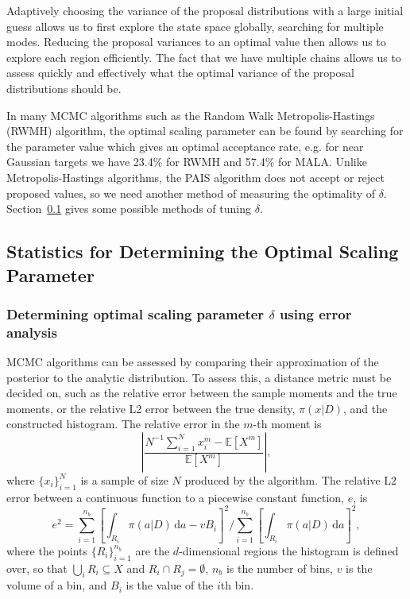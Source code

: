\documentclass[final]{siamltex}
\begin{document}
Adaptively choosing the variance of the proposal distributions with a
large initial guess allows us to first explore the state space
globally, searching for multiple modes. Reducing the proposal variances to an
optimal value then allows us to explore each region efficiently. The
fact that we have multiple chains allows us to assess quickly and
effectively what the optimal variance of the proposal distributions
should be. 

In many MCMC algorithms such as the Random Walk Metropolis-Hastings (RWMH) algorithm, the optimal scaling parameter can be found by searching for the parameter value which gives an optimal acceptance rate, e.g. for near Gaussian targets we have 23.4\% for RWMH and 57.4\% for MALA\cite{roberts2001optimal}. Unlike Metropolis-Hastings algorithms, the PAIS algorithm does not accept or reject proposed values, so we need another method of measuring the optimality of $\delta$. Section~\ref{sec:statistics} gives some possible methods of tuning $\delta$.

\subsection{Statistics for Determining the Optimal Scaling Parameter}\label{sec:statistics}

\subsubsection{Determining optimal scaling parameter $\delta$ using error analysis}

MCMC algorithms can be assessed by comparing their approximation of the posterior to the analytic distribution. To assess this, a distance metric must be decided on, such as the relative error between the sample moments and the true moments, or the relative L2 error between the true density, $\pi(x|D)$, and the constructed histogram. The relative error in the $m$-th moment is
\[
	\left|\frac{N^{-1}\sum_{i=1}^N \! x_i^m - \mathbb{E}[X^m]}{\mathbb{E}[X^m]}\right|,
\]
where $\{x_i\}_{i=1}^N$ is a sample of size $N$ produced by the algorithm. The relative L2 error between a continuous function to a piecewise constant function, $e$, is
\begin{equation}\label{eqn:L2_error}
	e^2 = \sum\limits_{i=1}^{n_b}\left[\displaystyle\int_{R_i} \! \pi(a|D) \, \mbox{d}a - vB_i\right]^2 \Big/ \sum\limits_{i=1}^{n_b}\left[\displaystyle\int_{R_i} \! \pi(a|D) \, \mbox{d}a\right]^2,
\end{equation}
where the points $\{R_i\}_{i=1}^{n_b}$ are the $d$-dimensional regions the histogram is defined over, so that $\bigcup_i R_i \subseteq X$ and $R_i\cap R_j=\emptyset$, $n_b$ is the number of bins, $v$ is the volume of a bin, and $B_i$ is the value of the $i$th bin. 
\end{document}
